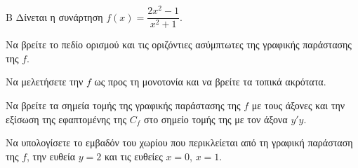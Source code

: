 \begin{thema}{Β}
Δίνεται η συνάρτηση $f(x) = \dfrac{2x^2-1}{x^2+1}$.
\begin{erwthma}
\item Να βρείτε το πεδίο ορισμού και τις οριζόντιες ασύμπτωτες της γραφικής παράστασης της $f$.
\item Να μελετήσετε την $f$ ως προς τη μονοτονία και να βρείτε τα τοπικά ακρότατα.
\item Να βρείτε τα σημεία τομής της γραφικής παράστασης της $f$ με τους άξονες και την εξίσωση της εφαπτομένης της $C_f$ στο σημείο τομής της με τον άξονα $y'y$.
\item Να υπολογίσετε το εμβαδόν του χωρίου που περικλείεται από τη γραφική παράσταση της $f$, την ευθεία $y=2$ και τις ευθείες $x=0$, $x=1$.
\end{erwthma}
\end{thema}
